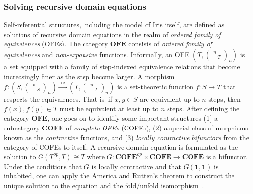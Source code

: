 \documentclass{article}
\theoremstyle{definition}
\theoremstyle{plain}
\theoremstyle{remark}
\newcommand{\OFE}{\mathbf{OFE}}
\newcommand{\COFE}{\mathbf{COFE}}
\begin{document}
\subsubsection{Solving recursive domain equations}
Self-referential structures, including the model of Iris itself, are defined as solutions of recursive domain equations in the realm of \emph{ordered family of equivalences} (OFEs).
The category \(\OFE\) consists of \emph{ordered family of equivalences} and \emph{non-expansive} functions.
Informally, an OFE \((T,{(\stackrel{n}{=}_T)}_n)\) is a set equipped with a family of step-indexed equivalence relations that become increasingly finer as the step become larger.
A morphism \(f : (S,{(\stackrel{n}{=}_S)}_n) \stackrel{\mathrm{n.e.}}{\to} (T,{(\stackrel{n}{=}_T)}_n)\) is a set-theoretic function \(f : S \to T\) that respects the equivalences.
That is, if \(x,y \in S\) are equivalent up to \(n\) steps, then \(f(x),f(y) \in T\) must be equivalent at least up to \(n\) steps.
After defining the category \(\OFE\), one goes on to identify some important structures
(1) a subcategory \(\COFE\) of \emph{complete OFEs} (COFEs),
(2) a special class of morphisms known as the \emph{contractive} functions,
and (3) \emph{locally contractive bifunctors} from the category of COFEs to itself.
A recursive domain equation is formulated as the solution to \(G(T^{op}, T) \cong T\) where \(G : \COFE^{op} \times \COFE \to \COFE\) is a bifunctor.
Under the conditions that \(G\) is locally contractive and that \(G(\mathbf{1}, \mathbf{1})\) is inhabited,
one can apply the America and Rutten’s theorem to construct the unique solution to the equation and the fold/unfold isomorphism~\cite{iris3}.
\end{document}
